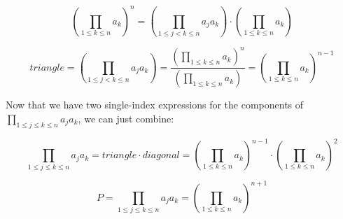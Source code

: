 \documentclass{article}
\def\prob{\prod_{1 \leq j \leq k \leq n} a_j a_k}
\begin{document}
\begin{equation}
    \left( \prod_{1 \leq k \leq n} a_k \right)^n
    = \left( \prod_{1 \leq j < k \leq n} a_j a_k \right)
    \cdot \left( \prod_{1 \leq k \leq n} a_k \right)
\end{equation}

\begin{equation}
    triangle = \left( \prod_{1 \leq j < k \leq n} a_j a_k \right)
    = \frac{\left( \prod_{1 \leq k \leq n} a_k \right)^n}{\left( \prod_{1 \leq k \leq n} a_k \right)}
    = \left( \prod_{1 \leq k \leq n} a_k \right)^{n - 1}
\end{equation}

Now that we have two single-index expressions for the
components of $\prob$, we can just combine:

\begin{equation}
    \prob = triangle \cdot diagonal
    = \left( \prod_{1 \leq k \leq n} a_k \right)^{n - 1}
    \cdot \left( \prod_{1 \leq k \leq n} a_k \right)^2
\end{equation}

\begin{equation}
    P = \prob = \left( \prod_{1 \leq k \leq n} a_k \right)^{n + 1}
\end{equation}
\end{document}
